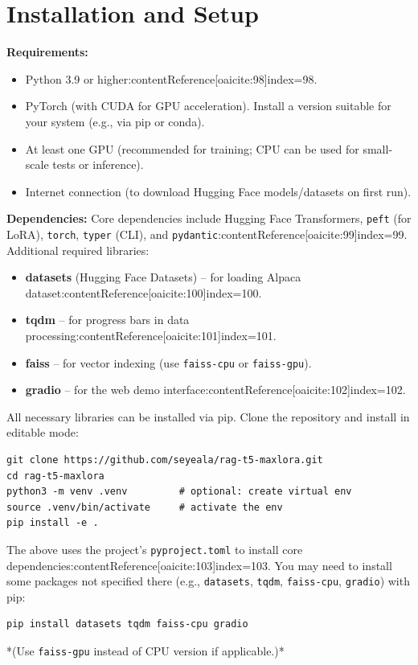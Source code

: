 \documentclass{article}
\begin{document}
\section{Installation and Setup}
\textbf{Requirements:}
\begin{itemize}
    \item Python 3.9 or higher:contentReference[oaicite:98]{index=98}.
    \item PyTorch (with CUDA for GPU acceleration). Install a version suitable for your system (e.g., via pip or conda).
    \item At least one GPU (recommended for training; CPU can be used for small-scale tests or inference).
    \item Internet connection (to download Hugging Face models/datasets on first run).
\end{itemize}

\textbf{Dependencies:} Core dependencies include Hugging Face Transformers, \texttt{peft} (for LoRA), \texttt{torch}, \texttt{typer} (CLI), and \texttt{pydantic}:contentReference[oaicite:99]{index=99}. Additional required libraries:
\begin{itemize}
    \item \textbf{datasets} (Hugging Face Datasets) – for loading Alpaca dataset:contentReference[oaicite:100]{index=100}.
    \item \textbf{tqdm} – for progress bars in data processing:contentReference[oaicite:101]{index=101}.
    \item \textbf{faiss} – for vector indexing (use \texttt{faiss-cpu} or \texttt{faiss-gpu}).
    \item \textbf{gradio} – for the web demo interface:contentReference[oaicite:102]{index=102}.
\end{itemize}

All necessary libraries can be installed via pip. Clone the repository and install in editable mode:
\begin{verbatim}
git clone https://github.com/seyeala/rag-t5-maxlora.git
cd rag-t5-maxlora
python3 -m venv .venv         # optional: create virtual env
source .venv/bin/activate     # activate the env
pip install -e .
\end{verbatim}

The above uses the project’s \texttt{pyproject.toml} to install core dependencies:contentReference[oaicite:103]{index=103}. You may need to install some packages not specified there (e.g., \texttt{datasets}, \texttt{tqdm}, \texttt{faiss-cpu}, \texttt{gradio}) with pip:
\begin{verbatim}
pip install datasets tqdm faiss-cpu gradio
\end{verbatim}
*(Use \texttt{faiss-gpu} instead of CPU version if applicable.)*
\end{document}
